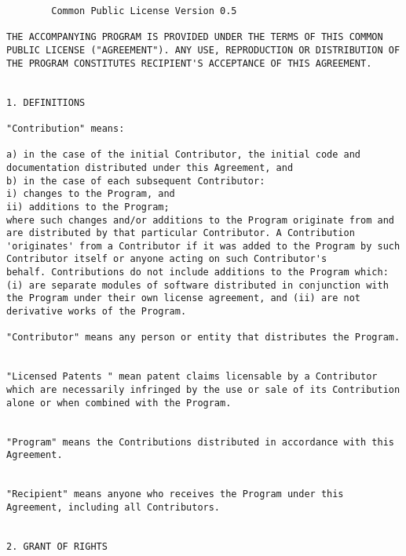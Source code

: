 \begin{verbatim}
		Common Public License Version 0.5 

THE ACCOMPANYING PROGRAM IS PROVIDED UNDER THE TERMS OF THIS COMMON
PUBLIC LICENSE ("AGREEMENT"). ANY USE, REPRODUCTION OR DISTRIBUTION OF
THE PROGRAM CONSTITUTES RECIPIENT'S ACCEPTANCE OF THIS AGREEMENT.


1. DEFINITIONS 

"Contribution" means: 

a) in the case of the initial Contributor, the initial code and
documentation distributed under this Agreement, and  
b) in the case of each subsequent Contributor:
i) changes to the Program, and
ii) additions to the Program;
where such changes and/or additions to the Program originate from and
are distributed by that particular Contributor. A Contribution
'originates' from a Contributor if it was added to the Program by such
Contributor itself or anyone acting on such Contributor's
behalf. Contributions do not include additions to the Program which:
(i) are separate modules of software distributed in conjunction with
the Program under their own license agreement, and (ii) are not
derivative works of the Program. 

"Contributor" means any person or entity that distributes the Program. 


"Licensed Patents " mean patent claims licensable by a Contributor
which are necessarily infringed by the use or sale of its Contribution
alone or when combined with the Program.  


"Program" means the Contributions distributed in accordance with this
Agreement.  


"Recipient" means anyone who receives the Program under this
Agreement, including all Contributors.  


2. GRANT OF RIGHTS 


\end{verbatim}
